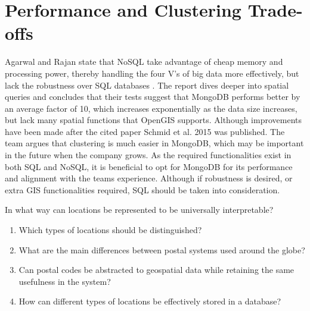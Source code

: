 \section{Performance and Clustering Trade-offs}
Agarwal and Rajan state that NoSQL take advantage of cheap memory and processing power, thereby handling the four V’s of big data more effectively,
but lack the robustness over SQL databases . The report dives deeper into spatial queries and concludes that their tests suggest that MongoDB performs better by an average factor of 10, which increases exponentially as the data size increases, but lack many spatial functions that OpenGIS supports. Although improvements have been made  after the cited paper Schmid et al. 2015  was published. The team argues that clustering is much easier in MongoDB, which may be important in the future when the company grows. As the required functionalities exist in both SQL and NoSQL, it is beneficial to opt for MongoDB for its performance and alignment with the teams experience. Although if robustness is desired, or extra GIS functionalities required, SQL should be taken into consideration.


In what way can locations be represented to be universally interpretable?
\begin{enumerate}
  \item Which types of locations should be distinguished?
  \item What are the main differences between postal systems used around the globe?
  \item Can postal codes be abstracted to geospatial data while retaining the same usefulness in the system?
  \item How can different types of locations be effectively stored in a database?
\end{enumerate}
